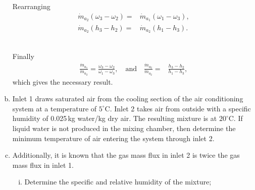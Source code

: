 \documentclass[calculator,steamtables,refrigeranttables,psychrometricchart,datasheet,solutions,resit]{exam}
\begin{document}
\begin{question}
\begin{enumerate}[(a)]
{Rearranging
\begin{align*}
 \dot{m}_{a_2} \left(\omega_3 - \omega_2\right) =& \dot{m}_{a_1} \left(\omega_1 - \omega_3\right), \\
 \dot{m}_{a_2} \left(h_3 - h_2\right) =& \dot{m}_{a_2} \left(h_1 - h_3\right).
\end{align*}~

Finally
\begin{align*}
 \frac{\dot{m}_{a_1}}{\dot{m}_{a_2}} = \frac{\omega_3 - \omega_2}{\omega_1 - \omega_3}, \quad \mbox{and} \quad \frac{\dot{m}_{a_2}}{\dot{m}_{a_2}} =& \frac{h_3 - h_2}{h_1 - h_3},
\end{align*}
which gives the necessary result.
}

\item Inlet 1 draws saturated air from the cooling section of the air conditioning system at a temperature of $5^\circ$C. Inlet 2 takes air from outside with a specific humidity of 0.025\,kg water/kg dry air. The resulting mixture is at $20^\circ$C. If liquid water is not produced in the mixing chamber, then determine the minimum temperature of air entering the system through inlet 2. 

\item Additionally, it is known that the gas mass flux in inlet 2 is twice the gas mass flux in inlet 1.
\begin{enumerate}[(i)]
\item Determine the specific and relative humidity of the mixture; 
\end{enumerate}
\end{enumerate}
\end{question}
\end{document}
